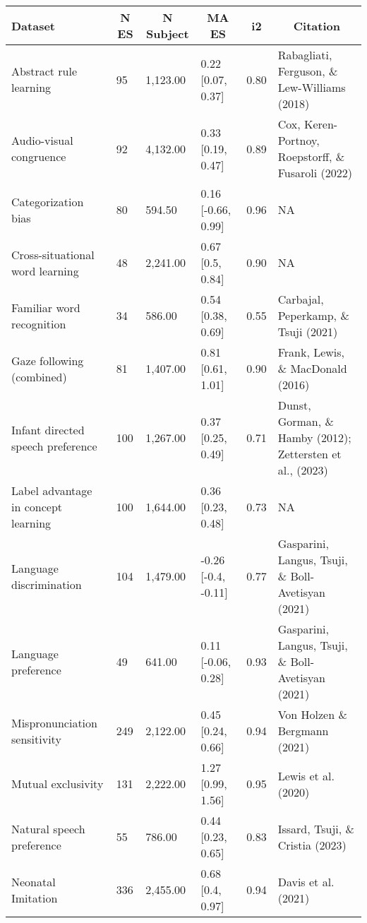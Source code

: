 \documentclass[
]{article}
\begin{document}
\begin{table}[tbp]

\begin{center}
\begin{threeparttable}

\caption{\label{tab:unnamed-chunk-4}}

\begin{tabular}{llllll}
\toprule
Dataset & \multicolumn{1}{c}{N ES} & \multicolumn{1}{c}{N Subject} & \multicolumn{1}{c}{MA ES} & \multicolumn{1}{c}{i2} & \multicolumn{1}{c}{Citation}\\
\midrule
Abstract rule learning & 95 & 1,123.00 & 0.22 [0.07, 0.37] & 0.80 & Rabagliati, Ferguson, \& Lew-Williams (2018)\\
Audio-visual congruence & 92 & 4,132.00 & 0.33 [0.19, 0.47] & 0.89 & Cox, Keren-Portnoy, Roepstorff, \& Fusaroli (2022)\\
Categorization bias & 80 & 594.50 & 0.16 [-0.66, 0.99] & 0.96 & NA\\
Cross-situational word learning & 48 & 2,241.00 & 0.67 [0.5, 0.84] & 0.90 & NA\\
Familiar word recognition & 34 & 586.00 & 0.54 [0.38, 0.69] & 0.55 & Carbajal, Peperkamp, \& Tsuji (2021)\\
Gaze following (combined) & 81 & 1,407.00 & 0.81 [0.61, 1.01] & 0.90 & Frank, Lewis, \& MacDonald (2016)\\
Infant directed speech preference & 100 & 1,267.00 & 0.37 [0.25, 0.49] & 0.71 & Dunst, Gorman, \& Hamby (2012); Zettersten et al., (2023)\\
Label advantage in concept learning & 100 & 1,644.00 & 0.36 [0.23, 0.48] & 0.73 & NA\\
Language discrimination & 104 & 1,479.00 & -0.26 [-0.4, -0.11] & 0.77 & Gasparini, Langus, Tsuji, \& Boll-Avetisyan (2021)\\
Language preference & 49 & 641.00 & 0.11 [-0.06, 0.28] & 0.93 & Gasparini, Langus, Tsuji, \& Boll-Avetisyan (2021)\\
Mispronunciation sensitivity & 249 & 2,122.00 & 0.45 [0.24, 0.66] & 0.94 & Von Holzen \& Bergmann (2021)\\
Mutual exclusivity & 131 & 2,222.00 & 1.27 [0.99, 1.56] & 0.95 & Lewis et al. (2020)\\
Natural speech preference & 55 & 786.00 & 0.44 [0.23, 0.65] & 0.83 & Issard, Tsuji, \& Cristia (2023)\\
Neonatal Imitation & 336 & 2,455.00 & 0.68 [0.4, 0.97] & 0.94 & Davis et al. (2021)\\

\end{tabular}
\end{threeparttable}
\end{center}
\end{table}
\end{document}
